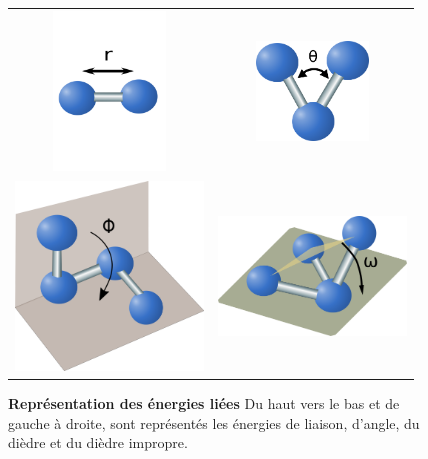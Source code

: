    \begin{figure}[!htbp]
     \centering
     \begin{tabular}{cc}
       \includegraphics[width=3cm]{figure/liaison.png} &
       \includegraphics[width=3cm]{figure/angle.png} \\
       \includegraphics[width=5cm]{figure/dihedre.png} &
       \includegraphics[width=5cm]{figure/impropre.png} \\

     \end{tabular}
     
     \caption{\textbf{Représentation des énergies liées} Du haut vers le bas et de gauche à droite, sont représentés les énergies de liaison, d'angle, du dièdre et du dièdre impropre.}
\label{graph:Eliees}
   \end{figure}

